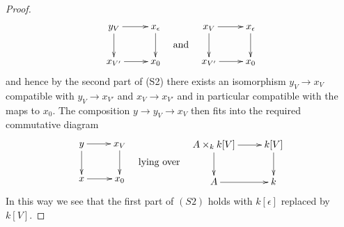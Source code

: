\documentclass[10pt,a4paper]{amsart}
\theoremstyle{plain}
\theoremstyle{definition}
\theoremstyle{remark}
\numberwithin{equation}{subsection}
\begin{document}
\begin{proof}
$$
\vcenter{
\xymatrix{
y_V \ar[r] \ar[d] & x_\epsilon \ar[d] \\
x_{V'} \ar[r]          & x_0
}
}
\quad\text{and}\quad
\vcenter{
\xymatrix{
x_V \ar[r] \ar[d] & x_\epsilon \ar[d] \\
x_{V'} \ar[r]                 & x_0
}
}
$$
and hence by the second part of (S2) there exists an isomorphism
$y_V \to x_V$ compatible with $y_V \to x_{V'}$ and $x_V \to x_{V'}$
and in particular compatible with the maps to $x_0$.
The composition $y \to y_V \to x_V$ then fits into the required commutative
diagram
$$
\vcenter{
\xymatrix{
y \ar[r] \ar[d] & x_V \ar[d] \\
x \ar[r] & x_0
}
}
\quad\text{lying over}\quad
\vcenter{
\xymatrix{
A \times_k k[V] \ar[d] \ar[r] & k[V] \ar[d] \\
A \ar[r] & k
}
}
$$
In this way we see that the first part of $(S2)$ holds with $k[\epsilon]$
replaced by $k[V]$.


\end{proof}
\end{document}
